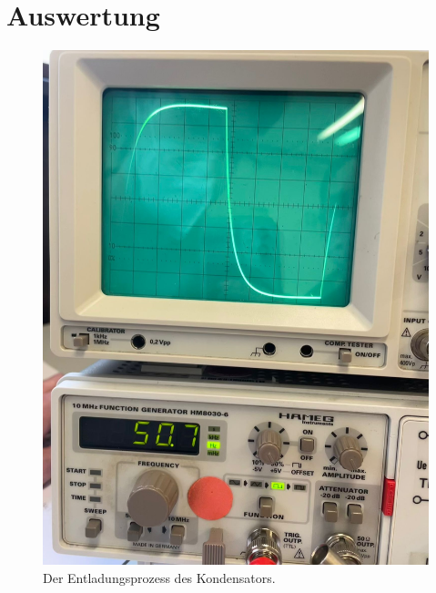 \section{Auswertung}
\label{sec:Auswertung}

\begin{figure}[H]
  \centering
  \includegraphics[scale=0.1]{content/entladung.png}
  \caption{Der Entladungsprozess des Kondensators.}
  \label{abb:Entladung}
\end{figure}

